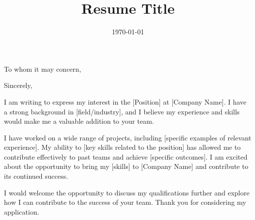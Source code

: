 \documentclass[11pt,a4paper,sans]{moderncv}        %
\title{Resume Title}                               %
\begin{document}
\date{\today}
\opening{To whom it may concern,}
\closing{Sincerely,}
\makelettertitle

I am writing to express my interest in the [Position] at [Company Name]. I have a strong background in [field/industry], and I believe my experience and skills would make me a valuable addition to your team. 

I have worked on a wide range of projects, including [specific examples of relevant experience]. My ability to [key skills related to the position] has allowed me to contribute effectively to past teams and achieve [specific outcomes]. I am excited about the opportunity to bring my [skills] to [Company Name] and contribute to its continued success.

I would welcome the opportunity to discuss my qualifications further and explore how I can contribute to the success of your team. Thank you for considering my application.

\makeletterclosing
\end{document}
